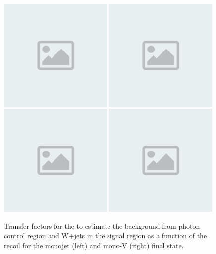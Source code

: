 \begin{figure}[htbp]
  \includegraphics[width=0.49\textwidth]{placeholder.png}
  \includegraphics[width=0.49\textwidth]{placeholder.png}
  \\
  \includegraphics[width=0.49\textwidth]{placeholder.png}
  \includegraphics[width=0.49\textwidth]{placeholder.png}
  \caption{Transfer factors for the to estimate the \Zvv background from photon control region and W+jets in the signal region as a function of the recoil for the monojet (left) and mono-V (right) final state.}\label{fig:ZvvWGSF}
\end{figure}

